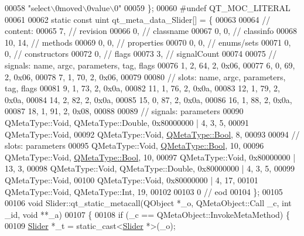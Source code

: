 \begin{DoxyCode}
00058     \textcolor{stringliteral}{"select\(\backslash\)0moved\(\backslash\)0value\(\backslash\)0"}
00059 \};
00060 \textcolor{preprocessor}{#undef QT\_MOC\_LITERAL}
00061 
00062 \textcolor{keyword}{static} \textcolor{keyword}{const} uint qt\_meta\_data\_Slider[] = \{
00063 
00064  \textcolor{comment}{// content:}
00065        7,       \textcolor{comment}{// revision}
00066        0,       \textcolor{comment}{// classname}
00067        0,    0, \textcolor{comment}{// classinfo}
00068       10,   14, \textcolor{comment}{// methods}
00069        0,    0, \textcolor{comment}{// properties}
00070        0,    0, \textcolor{comment}{// enums/sets}
00071        0,    0, \textcolor{comment}{// constructors}
00072        0,       \textcolor{comment}{// flags}
00073        3,       \textcolor{comment}{// signalCount}
00074 
00075  \textcolor{comment}{// signals: name, argc, parameters, tag, flags}
00076        1,    2,   64,    2, 0x06,
00077        6,    0,   69,    2, 0x06,
00078        7,    1,   70,    2, 0x06,
00079 
00080  \textcolor{comment}{// slots: name, argc, parameters, tag, flags}
00081        9,    1,   73,    2, 0x0a,
00082       11,    1,   76,    2, 0x0a,
00083       12,    1,   79,    2, 0x0a,
00084       14,    2,   82,    2, 0x0a,
00085       15,    0,   87,    2, 0x0a,
00086       16,    1,   88,    2, 0x0a,
00087       18,    1,   91,    2, 0x08,
00088 
00089  \textcolor{comment}{// signals: parameters}
00090     QMetaType::Void, QMetaType::Double, 0x80000000 | 4,    3,    5,
00091     QMetaType::Void,
00092     QMetaType::Void, \hyperlink{a00001_a76a8b016e5ad61faf9062cc387df5016}{QMetaType::Bool},    8,
00093 
00094  \textcolor{comment}{// slots: parameters}
00095     QMetaType::Void, \hyperlink{a00001_a76a8b016e5ad61faf9062cc387df5016}{QMetaType::Bool},   10,
00096     QMetaType::Void, \hyperlink{a00001_a76a8b016e5ad61faf9062cc387df5016}{QMetaType::Bool},   10,
00097     QMetaType::Void, 0x80000000 | 13,    3,
00098     QMetaType::Void, QMetaType::Double, 0x80000000 | 4,    3,    5,
00099     QMetaType::Void,
00100     QMetaType::Void, 0x80000000 | 4,   17,
00101     QMetaType::Void, QMetaType::Int,   19,
00102 
00103        0        \textcolor{comment}{// eod}
00104 \};
00105 
00106 \textcolor{keywordtype}{void} Slider::qt\_static\_metacall(QObject *\_o, QMetaObject::Call \_c, \textcolor{keywordtype}{int} \_id, \textcolor{keywordtype}{void} **\_a)
00107 \{
00108     \textcolor{keywordflow}{if} (\_c == QMetaObject::InvokeMetaMethod) \{
00109         \hyperlink{a00024}{Slider} *\_t = \textcolor{keyword}{static\_cast<}\hyperlink{a00024}{Slider} *\textcolor{keyword}{>}(\_o);

\end{DoxyCode}
